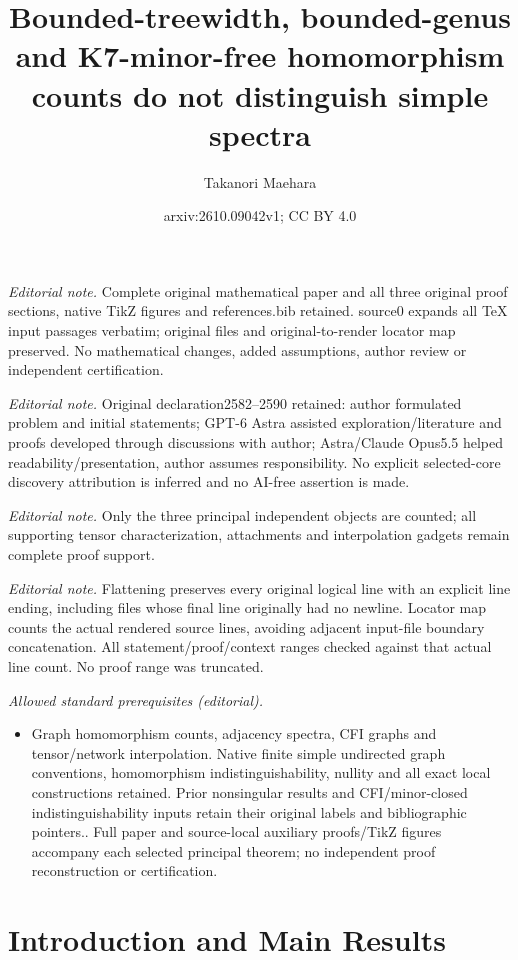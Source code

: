 \documentclass[10pt,a4paper]{article}
\title{Bounded-treewidth, bounded-genus and K7-minor-free homomorphism counts do not distinguish simple spectra}
\author{Takanori Maehara}
\date{arxiv:2610.09042v1; CC BY 4.0}
\theoremstyle{plain}
\theoremstyle{definition}
\begin{document}
\maketitle
\noindent\textit{Editorial note.} Complete original mathematical paper and all three original proof sections, native TikZ figures and references.bib retained. source0 expands all TeX input passages verbatim; original files and original-to-render locator map preserved. No mathematical changes, added assumptions, author review or independent certification.\par\medskip
\noindent\textit{Editorial note.} Original declaration2582--2590 retained: author formulated problem and initial statements; GPT-6 Astra assisted exploration/literature and proofs developed through discussions with author; Astra/Claude Opus5.5 helped readability/presentation, author assumes responsibility. No explicit selected-core discovery attribution is inferred and no AI-free assertion is made.\par\medskip
\noindent\textit{Editorial note.} Only the three principal independent objects are counted; all supporting tensor characterization, attachments and interpolation gadgets remain complete proof support.\par\medskip
\noindent\textit{Editorial note.} Flattening preserves every original logical line with an explicit line ending, including files whose final line originally had no newline. Locator map counts the actual rendered source lines, avoiding adjacent input-file boundary concatenation. All statement/proof/context ranges checked against that actual line count. No proof range was truncated.\par\medskip
\noindent\textit{Allowed standard prerequisites (editorial).}\begin{itemize}
\item Graph homomorphism counts, adjacency spectra, CFI graphs and tensor/network interpolation. Native finite simple undirected graph conventions, homomorphism indistinguishability, nullity and all exact local constructions retained. Prior nonsingular results and CFI/minor-closed indistinguishability inputs retain their original labels and bibliographic pointers.. Full paper and source-local auxiliary proofs/TikZ figures accompany each selected principal theorem; no independent proof reconstruction or certification.
\end{itemize}\medskip
\section{Introduction and Main Results}
\label{sec:intro}
\end{document}
